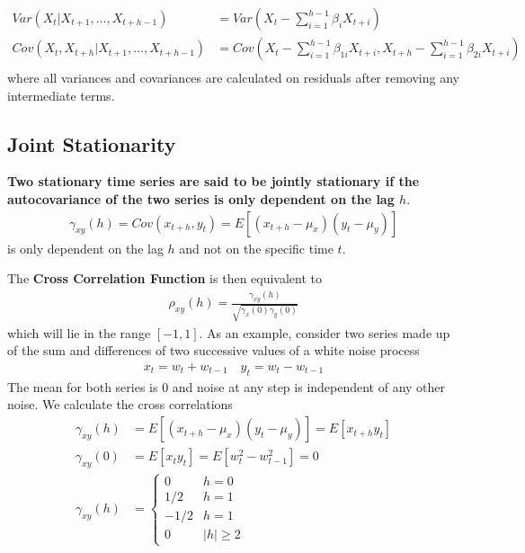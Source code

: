 \documentclass[../../time_series_notes.tex]{subfiles}
\begin{document}
\begin{align*}
    Var(X_{t}|X_{t+1},\ldots,X_{t+h-1}) &= Var(X_{t} - \sum_{i=1}^{h-1}\beta_{i}X_{t+i})\\
    Cov(X_{t},X_{t+h}|X_{t+1},\ldots,X_{t+h-1}) &= Cov(X_{t} - \sum_{i=1}^{h-1}\beta_{1i}X_{t+i}, X_{t+h} - \sum_{i=1}^{h-1}\beta_{2i}X_{t+i})\\
\end{align*}
where all variances and covariances are calculated on residuals after removing any intermediate terms.

\subsection{Joint Stationarity}
\textbf{Two stationary time series are said to be jointly stationary if the autocovariance of the two series is only dependent on the lag $h$}.\newline
\begin{align*}
    \gamma_{xy}(h) = Cov(x_{t+h}, y_{t}) = E[(x_{t+h} - \mu_{x})(y_{t} - \mu_{y})]
\end{align*}
is only dependent on the lag $h$ and not on the specific time $t$.\newline

The \textbf{Cross Correlation Function} is then equivalent to
\begin{align*}
    \rho_{xy}(h) = \frac{\gamma_{xy}(h)}{\sqrt{\gamma_{x}(0) \gamma_{y}(0)}}
\end{align*}
which will lie in the range $[-1,1]$. As an example, consider two series made up of the sum and differences of two successive values of a white noise process
\begin{align*}
    x_{t} = w_{t} + w_{t-1} \quad y_{t} = w_{t} - w_{t-1}
\end{align*}
The mean for both series is $0$ and noise at any step is independent of any other noise. We calculate the cross correlations
\begin{align*}
    \gamma_{xy}(h) &= E[(x_{t+h} - \mu_{x})(y_{t} - \mu_{y})] = E[x_{t+h}y_{t}]\\
    \gamma_{xy}(0) &= E[x_{t}y_{t}] = E[w_{t}^{2} - w_{t-1}^{2}] = 0\\
    \gamma_{xy}(h) &= \begin{cases} 0 &\mbox{$h = 0$}\\ 1/2 &\mbox{$h=1$}\\ -1/2 &\mbox{$h=1$}\\ 0 &\mbox{$\lvert h \rvert \geq 2$} \end{cases}
\end{align*}
\end{document}
